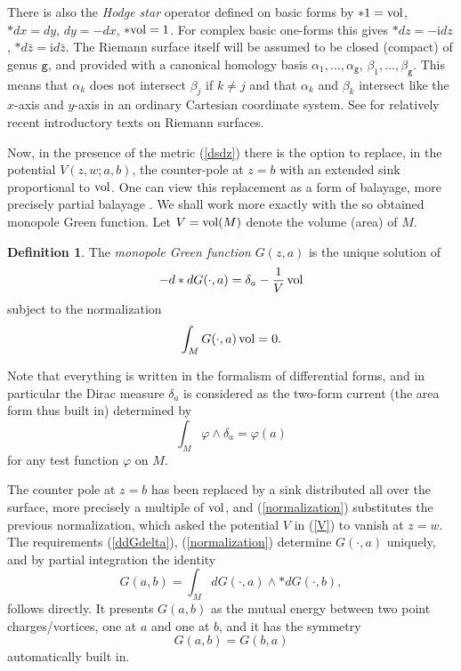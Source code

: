 \documentclass[reqno,12pt]{article}
\theoremstyle{plain}
\theoremstyle{definition}
\newtheorem{definition}{Definition}[section]
\numberwithin{equation}{section}
\numberwithin{figure}{section}
\def\I{\mathrm{i}}
\begin{document}
There is also the {\it Hodge star} operator defined on basic forms by
$*1={\rm vol}$, $*dx=dy$, $dy=-dx$, $*{\rm vol}=1$.
For complex basic one-forms this gives $*dz=-\I dz$, $*d\bar{z}=\I d\bar{z}$.
The Riemann surface itself will be assumed to be closed (compact) of genus $\texttt{g}$, and provided with a canonical 
homology basis $\alpha_1, \dots, \alpha_\texttt{g}$, $\beta_1, \dots, \beta_\texttt{g}$. This means that 
$\alpha_k$ does not intersect $\beta_j$ if $k\ne j$ and that $\alpha_k$ and $\beta_k$ intersect like the $x$-axis
and $y$-axis in an ordinary Cartesian coordinate system.
See \cite{Forster-1981, Farkas-Kra-1992} for relatively recent introductory texts on Riemann surfaces.

Now, in the presence of the metric (\ref{dsdz}) there is the option to replace, in the potential $V(z,w;a,b)$, 
the counter-pole at $z=b$ with an extended sink proportional to ${\rm vol}$.
One can view this replacement as a form of balayage, more precisely partial balayage \cite{Gustafsson-2004, Gustafsson-Roos-2018}. 
We shall work more exactly with the so obtained {monopole Green function}. 
Let $V={\rm vol}(M)$ denote the volume (area) of $M$.

\begin{definition}
The {\it monopole Green function} $G(z,a)$ is the unique solution of
\begin{equation}\label{ddGdelta}
-d*dG(\cdot,a) =\delta_a -\frac{1}{V}\,{\rm vol}
\end{equation}
subject to the normalization 
\begin{equation}\label{normalization}
\int_M G(\cdot,a)\, {\rm vol}=0.
\end{equation}
\end{definition}

Note that everything is written in the formalism of differential forms, and in particular
the Dirac measure $\delta_a$ is considered as the two-form current (the area form thus built in)
determined by 
\begin{equation}\label{varphideltaa}
\int_M \varphi\wedge  \delta_a=\varphi(a)
\end{equation}
for any test function $\varphi$ on $M$.

The counter pole at $z=b$ has been replaced by a sink distributed all over the surface, 
more precisely a multiple of ${\rm vol}$,  and (\ref{normalization}) substitutes the 
previous normalization, which  asked the potential $V$ in (\ref{V}) to vanish at  $z=w$.
The requirements (\ref{ddGdelta}), (\ref{normalization}) determine $G(\cdot, a)$ uniquely, and by partial integration the identity
\begin{equation}\label{mutual energyG}
G(a,b)=\int_M dG(\cdot,a)\wedge *dG(\cdot,b),
\end{equation}
follows directly. It presents $G(a,b)$ as the mutual energy between two point charges/vortices, one at $a$ and one at $b$,
and it has the symmetry
$$
G(a,b)=G(b,a)
$$  
automatically built in. 
\end{document}
